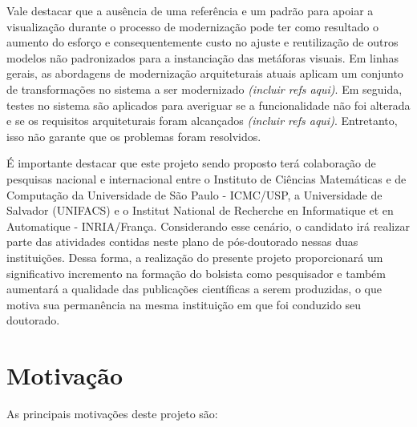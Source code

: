 \documentclass[12pt]{article}
\begin{document}
Vale destacar que a ausência de uma referência e um padrão para apoiar a visualização durante o processo de modernização pode ter como resultado o aumento do esforço e consequentemente custo no ajuste e reutilização de outros modelos não padronizados para a instanciação das metáforas visuais. Em linhas gerais, as abordagens de modernização arquiteturais atuais aplicam um conjunto de transformações no sistema a ser modernizado \textit{(incluir refs aqui)}. Em seguida, testes no sistema são aplicados para averiguar se a funcionalidade não foi alterada e se os requisitos arquiteturais foram alcançados \textit{(incluir refs aqui)}. Entretanto, isso não garante que os problemas foram resolvidos.

É importante destacar que este projeto sendo proposto terá colaboração de pesquisas nacional e internacional entre o Instituto de Ciências Matemáticas e de Computação da Universidade de São Paulo - ICMC/USP, a Universidade de Salvador (UNIFACS) e o Institut National de Recherche en Informatique et en Automatique - INRIA/França. Considerando esse cenário, o candidato irá realizar parte das atividades contidas neste plano de pós-doutorado nessas duas instituições. Dessa forma, a realização do presente projeto proporcionará um significativo incremento na formação do bolsista como pesquisador e também aumentará a qualidade das publicações científicas a serem produzidas, o que motiva sua permanência na mesma instituição em que foi conduzido seu doutorado.


\section{Motivação}

As principais motivações deste projeto são:
\end{document}
